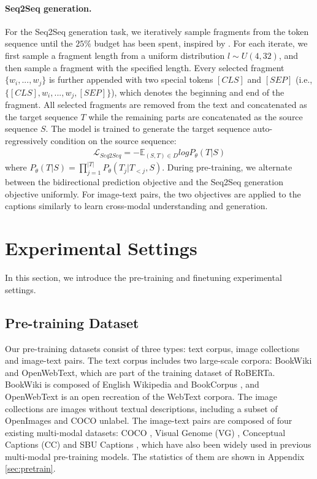 \documentclass[11pt,a4paper]{article}
\begin{document}
\paragraph{Seq2Seq generation.} 
For the Seq2Seq generation task, we iteratively sample fragments from the token sequence until the $25\%$ budget has been spent, inspired by \citet{xiao2020ernie}.
For each iterate, we first sample a fragment length from a uniform distribution $l \sim U(4,32)$, and then sample a fragment with the specified length.
Every selected fragment $\{w_i,...,w_j\}$ is further appended with two special tokens $[CLS]$ and $[SEP]$ (i.e., $\{[CLS],w_i,...,w_j,[SEP]\}$), which denotes the beginning and end of the fragment.
All selected fragments are removed from the text and concatenated as the target sequence $T$ while the remaining parts are concatenated as the source sequence $S$.
The model is trained to generate the target sequence auto-regressively condition on the source sequence:
\begin{equation}
\begin{aligned}
    \mathcal{L}_{Seq2Seq} = - \mathbb{E}_{(S,T) \in D} log P_{\theta} (T|S)
\end{aligned}
\label{eq3}
\end{equation}
where $P_{\theta} (T|S)= \prod_{j=1}^{|T|} P_{\theta}(T_j|T_{<j},S)$. During pre-training, we alternate between the bidirectional prediction objective and the Seq2Seq generation objective uniformly.
For image-text pairs, the two objectives are applied to the captions similarly to learn cross-modal understanding and generation.


\section{Experimental Settings}
\label{sec:set}

In this section, we introduce the pre-training and finetuning experimental settings.


\subsection{Pre-training Dataset}
\label{ssec:data}

Our pre-training datasets consist of three types: text corpus, image collections and image-text pairs. 
The text corpus includes two large-scale corpora: BookWiki and OpenWebText, which are part of the training dataset of RoBERTa. BookWiki is composed of English Wikipedia and BookCorpus \citep{zhu2015aligning}, and OpenWebText is an open recreation of the WebText corpora.
The image collections are images without textual descriptions, including a subset of OpenImages \citep{krasin2017openimages} and COCO unlabel.
The image-text pairs are composed of four existing multi-modal datasets: COCO \citep{lin2014microsoft}, Visual Genome (VG) \citep{krishna2017visual}, Conceptual Captions (CC) \citep{sharma-etal-2018-conceptual} and SBU Captions \citep{ordonez2011im2text}, which have also been widely used in previous multi-modal pre-training models.
The statistics of them are shown in Appendix \ref{sec:pretrain}.
\end{document}

